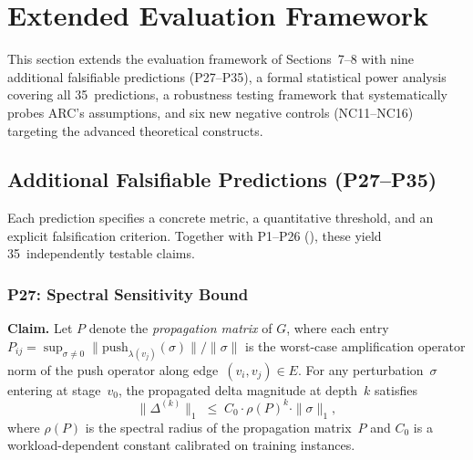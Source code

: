 \documentclass[11pt,a4paper]{article}
\theoremstyle{definition}
\newcommand{\DeltaS}{\Delta_{\!S}}
\newcommand{\DeltaD}{\Delta_{\!D}}
\newcommand{\DeltaQ}{\Delta_{\!Q}}
\newcommand{\push}{\mathrm{push}}
\newcommand{\cost}{\mathrm{cost}}
\newcommand{\FragF}{\mathcal{F}}
\begin{document}

\section{Extended Evaluation Framework}
\label{sec:extended-eval}

This section extends the evaluation framework of Sections~7--8 with nine
additional falsifiable predictions (P27--P35), a formal statistical power
analysis covering all 35~predictions, a robustness testing framework that
systematically probes ARC's assumptions, and six new negative controls
(NC11--NC16) targeting the advanced theoretical constructs.

\subsection{Additional Falsifiable Predictions (P27--P35)}
\label{sec:predictions-p27-p35}

Each prediction specifies a concrete metric, a quantitative threshold, and an
explicit falsification criterion.  Together with P1--P26
(), these yield 35~independently testable claims.

\subsubsection{P27: Spectral Sensitivity Bound}
\label{sec:p27}

\textbf{Claim.}
Let $P$ denote the \emph{propagation matrix} of $G$, where each entry
$P_{ij} = \sup_{\sigma \neq 0} \|\push_{\lambda(v_j)}(\sigma)\| / \|\sigma\|$
is the worst-case amplification operator norm of the push operator along
edge~$(v_i, v_j) \in E$.  For any perturbation~$\sigma$ entering at
stage~$v_0$, the propagated delta magnitude at depth~$k$ satisfies
\[
  \|\Delta^{(k)}\|_1
  \;\leq\;
  C_0 \cdot \rho(P)^k \cdot \|\sigma\|_1,
\]
where $\rho(P)$ is the spectral radius of the propagation matrix~$P$
and $C_0$ is a workload-dependent constant calibrated on training instances.
\end{document}

